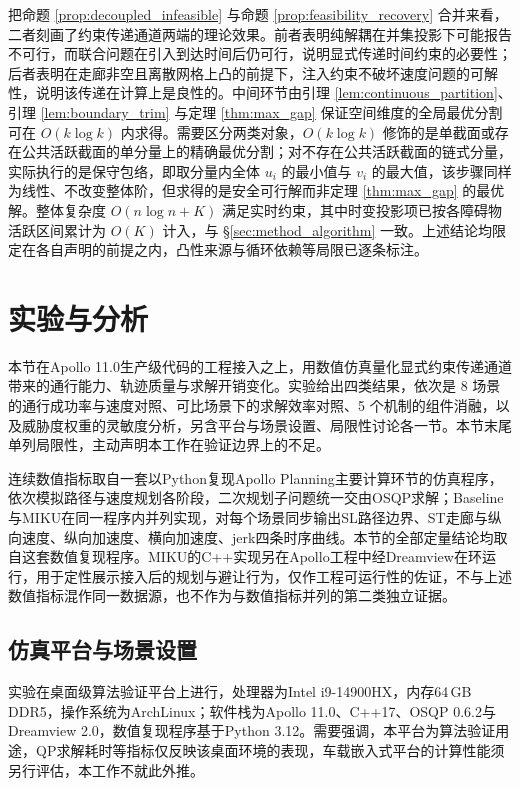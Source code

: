 \documentclass[a4paper,11pt]{ctexart}
\theoremstyle{definition}
\begin{document}
把命题 \ref{prop:decoupled_infeasible} 与命题 \ref{prop:feasibility_recovery} 合并来看，二者刻画了约束传递通道两端的理论效果。前者表明纯解耦在并集投影下可能报告不可行，而联合问题在引入到达时间后仍可行，说明显式传递时间约束的必要性；后者表明在走廊非空且离散网格上凸的前提下，注入约束不破坏速度问题的可解性，说明该传递在计算上是良性的。中间环节由引理 \ref{lem:continuous_partition}、引理 \ref{lem:boundary_trim} 与定理 \ref{thm:max_gap} 保证空间维度的全局最优分割可在 $O(k \log k)$ 内求得。需要区分两类对象，$O(k\log k)$ 修饰的是单截面或存在公共活跃截面的单分量上的精确最优分割；对不存在公共活跃截面的链式分量，实际执行的是保守包络，即取分量内全体 $u_i$ 的最小值与 $v_i$ 的最大值，该步骤同样为线性、不改变整体阶，但求得的是安全可行解而非定理 \ref{thm:max_gap} 的最优解。整体复杂度 $O(n \log n + K)$ 满足实时约束，其中时变投影项已按各障碍物活跃区间累计为 $O(K)$ 计入，与 §\ref{sec:method_algorithm} 一致。上述结论均限定在各自声明的前提之内，凸性来源与循环依赖等局限已逐条标注。

\section{实验与分析}
\label{sec:experiment}

本节在Apollo 11.0生产级代码的工程接入之上，用数值仿真量化显式约束传递通道带来的通行能力、轨迹质量与求解开销变化。实验给出四类结果，依次是 8 场景的通行成功率与速度对照、可比场景下的求解效率对照、5 个机制的组件消融，以及威胁度权重的灵敏度分析，另含平台与场景设置、局限性讨论各一节。本节末尾单列局限性，主动声明本工作在验证边界上的不足。

连续数值指标取自一套以Python复现Apollo Planning主要计算环节的仿真程序，依次模拟路径与速度规划各阶段，二次规划子问题统一交由OSQP求解；Baseline与MIKU在同一程序内并列实现，对每个场景同步输出SL路径边界、ST走廊与纵向速度、纵向加速度、横向加速度、jerk四条时序曲线。本节的全部定量结论均取自这套数值复现程序。MIKU的C++实现另在Apollo工程中经Dreamview在环运行，用于定性展示接入后的规划与避让行为，仅作工程可运行性的佐证，不与上述数值指标混作同一数据源，也不作为与数值指标并列的第二类独立证据。

\subsection{仿真平台与场景设置}
\label{subsec:exp_setup}

实验在桌面级算法验证平台上进行，处理器为Intel i9-14900HX，内存64\,GB DDR5，操作系统为ArchLinux；软件栈为Apollo 11.0、C++17、OSQP 0.6.2与Dreamview 2.0，数值复现程序基于Python 3.12。需要强调，本平台为算法验证用途，QP求解耗时等指标仅反映该桌面环境的表现，车载嵌入式平台的计算性能须另行评估，本工作不就此外推。
\end{document}
